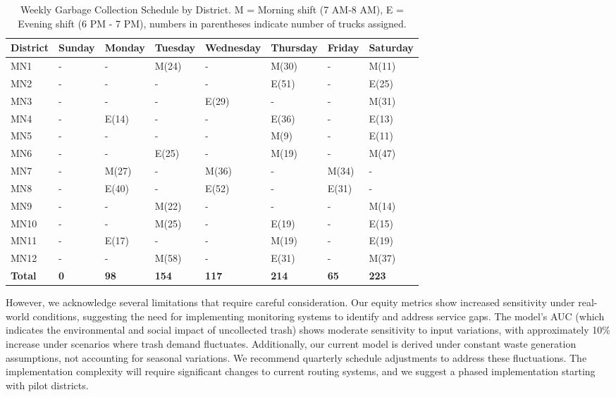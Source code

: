 \documentclass{article}
\begin{document}
\begin{table}[H]
\centering
\begin{tabular}{|l|l|l|l|l|l|l|l|}
\hline
District & Sunday & Monday & Tuesday & Wednesday & Thursday & Friday & Saturday \\ \hline
MN1 & - & - & M(24) & - & M(30) & - & M(11) \\ \hline
MN2 & - & - & - & - & E(51) & - & E(25) \\ \hline
MN3 & - & - & - & E(29) & - & - & M(31) \\ \hline
MN4 & - & E(14) & - & - & E(36) & - & E(13) \\ \hline
MN5 & - & - & - & - & M(9) & - & E(11) \\ \hline
MN6 & - & - & E(25) & - & M(19) & - & M(47) \\ \hline
MN7 & - & M(27) & - & M(36) & - & M(34) & - \\ \hline
MN8 & - & E(40) & - & E(52) & - & E(31) & - \\ \hline
MN9 & - & - & M(22) & - & - & - & M(14) \\ \hline
MN10 & - & - & M(25) & - & E(19) & - & E(15) \\ \hline
MN11 & - & E(17) & - & - & M(19) & - & E(19) \\ \hline
MN12 & - & - & M(58) & - & E(31) & - & M(37) \\ \hline
\textbf{Total} & \textbf{0} & \textbf{98} & \textbf{154} & \textbf{117} & \textbf{214} & \textbf{65} & \textbf{223} \\ \hline
\end{tabular}
\label{tab:schedule}
\caption*{Weekly Garbage Collection Schedule by District. M = Morning shift (7 AM-8 AM), E = Evening shift (6 PM - 7 PM), numbers in parentheses indicate number of trucks assigned.}
\end{table}

However, we acknowledge several limitations that require careful consideration. Our equity metrics show increased sensitivity under real-world conditions, suggesting the need for implementing monitoring systems to identify and address service gaps. The model's AUC (which indicates the environmental and social impact of uncollected trash) shows moderate sensitivity to input variations, with approximately 10\% increase under scenarios where trash demand fluctuates. Additionally, our current model is derived under constant waste generation assumptions, not accounting for seasonal variations. We recommend quarterly schedule adjustments to address these fluctuations. The implementation complexity will require significant changes to current routing systems, and we suggest a phased implementation starting with pilot districts.
\end{document}
